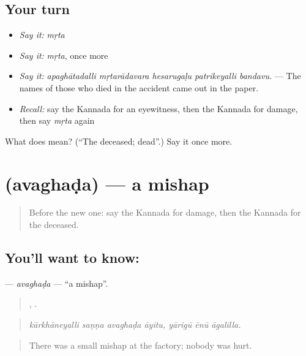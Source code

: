 \subsection*{Your turn}
\begin{itemize}
\raggedright
  \item \emph{Say it:} \emph{mṛta}
  \item \emph{Say it:} \emph{mṛta}, once more
  \item \emph{Say it:} \emph{apaghātadalli mṛtarādavara hesarugaḷu patrikeyalli bandavu.} — The names of those who died in the accident came out in the paper.
  \item \emph{Recall:} say the Kannada for an eyewitness, then the Kannada for damage, then say \emph{mṛta} again
\end{itemize}

\begin{tcolorbox}[breakable,colback=teal!4,colframe=teal!35!black,title={Before you move on}]
What does  mean? (\textquotedblleft{}The deceased; dead\textquotedblright{}.) Say it once more.
\end{tcolorbox}
\section[\texorpdfstring{\kn{ಅವಘಡ} (avaghaḍa)}{ಅವಘಡ (avaghaḍa)}]{ (avaghaḍa) — a mishap}

\label{lesson:KA-C330-avaghada}



\begin{quote}
Before the new one: say the Kannada for damage, then the Kannada for the deceased.
\end{quote}

\subsection*{You'll want to know: }
\textbf{} — \emph{avaghaḍa} — \textquotedblleft{}a mishap\textquotedblright{}.

\begin{quote}
   ,   .
\end{quote}

\begin{quote}
\emph{kārkhāneyalli saṇṇa avaghaḍa āyitu, yārigū ēnū āgalilla.}
\end{quote}

\begin{quote}
There was a small mishap at the factory; nobody was hurt.
\end{quote}

